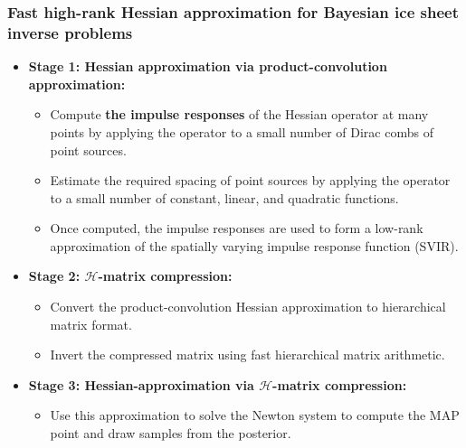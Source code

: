 \documentclass[10pt,final,xcolor=dvipsnames]{beamer}
\begin{document}
\begin{frame}
  \frametitle{Fast high-rank Hessian approximation for Bayesian ice
    sheet inverse problems}
      \begin{itemize}
      \item {\bf Stage 1: Hessian approximation via product-convolution
        approximation:}
        \begin{itemize}
        \item Compute {\bf the impulse responses} of the Hessian operator at
          many points by applying the operator to a small number of Dirac
          combs of point sources.
        \item Estimate the required spacing of point sources by applying the
          operator to a small number of constant, linear, and quadratic
          functions.
        \item Once computed, the impulse responses are used to form a
          low-rank approximation of the spatially varying impulse response
          function (SVIR).
        \end{itemize}
      \item {\bf Stage 2: $\mathcal{H}$-matrix compression:}
        \begin{itemize}
        \item Convert the product-convolution Hessian approximation to
          hierarchical matrix format.
        \item Invert the compressed matrix using fast hierarchical matrix
          arithmetic.
        \end{itemize}

        \item {\bf Stage 3: Hessian-approximation via
          $\mathcal{H}$-matrix compression:}
          \begin{itemize}
            \item Use this approximation to solve the Newton system to
              compute the MAP point and draw samples from the
              posterior.
          \end{itemize}
      \end{itemize}
\end{frame}
\end{document}
